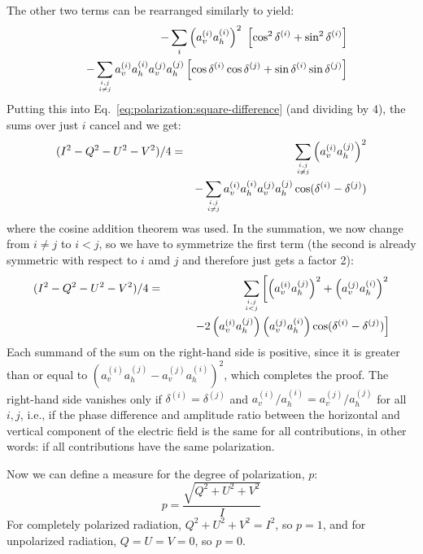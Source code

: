 The other two terms can be rearranged similarly to yield:
\begin{eqnarray}
 &&- \sum_i \left( a_v^{(i)} a_h^{(i)} \right)^2 \
           \left[\cos^2\delta^{(i)} + \sin^2\delta^{(i)} \right]\\ \nonumber
 &&- \sum_{{i,j}\atop{i\not=j}} a_v^{(i)} a_h^{(i)} a_v^{(j)} a_h^{(j)} 
    \left[\cos\delta^{(i)}\cos\delta^{(j)}  
          + \sin\delta^{(i)}\sin\delta^{(j)} \right] 
\end{eqnarray}
Putting this into Eq.~\ref{eq:polarization:square-difference} (and
dividing by 4), the sums over just $i$ cancel and we get:
\begin{eqnarray}
\label{eq:polarization:square-difference2}  
(I^2 - Q^2 - U^2 - V^2)/4 &=&
  \sum_{{i,j}\atop{i\not=j}} \left(a_v^{(i)}a_h^{(j)}\right)^2\\ \nonumber
 &&- \sum_{{i,j}\atop{i\not=j}} a_v^{(i)} a_h^{(i)} a_v^{(j)} a_h^{(j)} 
    \cos(\delta^{(i)}-\delta^{(j)}) 
\end{eqnarray}
where the cosine addition theorem was used.  In the summation, we now
change from $i \not= j$ to $i<j$, so we have to symmetrize the first
term (the second is already symmetric with respect to $i$ amd $j$ and
therefore just gets a factor 2):
\begin{eqnarray}
\label{eq:polarization:square-difference3}  
(I^2 - Q^2 - U^2 - V^2)/4 &=&
  \sum_{{i,j}\atop{i<j}}\left[ 
   \left(a_v^{(i)}a_h^{(j)}\right)^2
   +\left(a_v^{(j)}a_h^{(i)}\right)^2 \right. \\ \nonumber
 &&\qquad\left.
 - 2 \left(a_v^{(i)} a_h^{(j)} \right) \left(a_v^{(j)} a_h^{(i)}\right) 
    \cos(\delta^{(i)}-\delta^{(j)}) \right]
\end{eqnarray}
Each summand of the sum on the right-hand side is positive, since it
is greater than or equal to $(a_v^{(i)}a_h^{(j)} -
a_v^{(j)}a_h^{(i)})^2$, which completes the proof.
The right-hand side vanishes only if $\delta^{(i)}=\delta^{(j)}$ and
$a_v^{(i)}/a_h^{(i)} = a_v^{(j)}/a_h^{(j)}$ for all $i,j$, i.e., if
the phase difference and amplitude ratio between the horizontal and
vertical component of the electric field is the same for all
contributions, in other words: if all contributions have the same
polarization.

Now we can define a measure for the degree of polarization, $p$:
\begin{equation}
  \label{eq:polarization:pol_degree}
  p = \frac{\sqrt{Q^2 + U^2 + V^2}}{I}
\end{equation}
For completely polarized radiation, $Q^2 + U^2 + V^2 = I^2$, so $p =
1$, and for unpolarized radiation, $Q = U = V = 0$, so $p = 0$.

